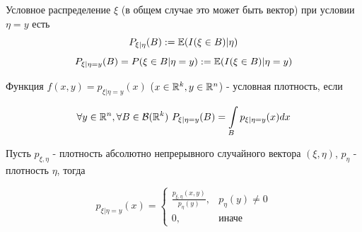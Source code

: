 \begin{definition}
    Условное распределение $\xi$ (в общем случае это может быть вектор) при условии $\eta=y$ есть 
    \[ P_{\xi|\eta}(B) := \operatorname{\mathbb{E}}(I(\xi \in B)|\eta) \]
    \[ P_{\xi|\eta = y}(B) = P(\xi \in B|\eta = y) := \operatorname{\mathbb{E}}(I(\xi \in B)|\eta = y) \]
\end{definition} 

\begin{definition}
    Функция $f(x, y) = p_{\xi|\eta = y}(x)$ ($x \in \mathbb{R}^k, y \in \mathbb{R}^n$) - условная плотность, если 

    \[ \forall y \in \mathbb{R}^n, \forall B \in \mathcal{B}(\mathbb{R}^k) \ P_{\xi|\eta = y}(B) = \int\limits_{B}p_{\xi|\eta = y}(x)dx \]
\end{definition}

\begin{statement}
    Пусть $p_{\xi, \eta}$ - плотность абсолютно непрерывного случайного вектора $(\xi, \eta)$, $p_\eta$ - плотность $\eta$, тогда
    
    \[ p_{\xi|\eta = y}(x) = \begin{cases} 
    \frac{p_{\xi, \eta}(x, y)}{p_\eta(y)}, & p_\eta(y) \ne 0 \\ 
    0, & \text{иначе}
    \end{cases} \]
\end{statement} 

